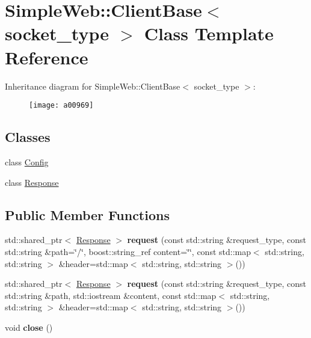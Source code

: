 \hypertarget{a00969}{}\section{Simple\+Web\+:\+:Client\+Base$<$ socket\+\_\+type $>$ Class Template Reference}
\label{a00969}
Inheritance diagram for Simple\+Web\+:\+:Client\+Base$<$ socket\+\_\+type $>$\+:\begin{figure}[H]
\begin{center}
\leavevmode
\texttt{[image: a00969]}
\end{center}
\end{figure}
\subsection*{Classes}
\begin{DoxyCompactItemize}
\item 
class \hyperlink{a00977}{Config}
\item 
class \hyperlink{a00973}{Response}
\end{DoxyCompactItemize}
\subsection*{Public Member Functions}
\begin{DoxyCompactItemize}
\item 
\mbox{\label{a00969_ac8a838ace77f0a1a19b8cb03bdba7e74}} 
std\+::shared\+\_\+ptr$<$ \hyperlink{a00973}{Response} $>$ {\bfseries request} (const std\+::string \&request\+\_\+type, const std\+::string \&path=\char`\"{}/\char`\"{}, boost\+::string\+\_\+ref content=\char`\"{}\char`\"{}, const std\+::map$<$ std\+::string, std\+::string $>$ \&header=std\+::map$<$ std\+::string, std\+::string $>$())
\item 
\mbox{\label{a00969_aca6cb17dbea9adf0cf1daf9d1ea70f76}} 
std\+::shared\+\_\+ptr$<$ \hyperlink{a00973}{Response} $>$ {\bfseries request} (const std\+::string \&request\+\_\+type, const std\+::string \&path, std\+::iostream \&content, const std\+::map$<$ std\+::string, std\+::string $>$ \&header=std\+::map$<$ std\+::string, std\+::string $>$())
\item 
\mbox{\label{a00969_ad21735a9bda2fae6aedd811efae981e1}} 
void {\bfseries close} ()
\end{DoxyCompactItemize}
